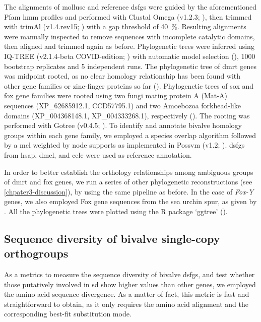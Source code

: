 The alignments of mollusc and reference \glspl{dsfg} were guided by the aforementioned Pfam \gls{hmm} profiles and performed with Clustal Omega (v1.2.3; ), then trimmed with trimAl (v1.4.rev15; ) with a gap threshold of \qty{40}{\percent}. Resulting alignments were manually inspected to remove sequences with incomplete catalytic domains, then aligned and trimmed again as before. Phylogenetic trees were inferred using IQ-TREE (v2.1.4-beta COVID-edition; ) with automatic model selection (), 1000 bootstrap replicates and 5 independent runs. The phylogenetic tree of \gls{dmrt} genes was midpoint rooted, as no clear homology relationship has been found with other gene families or zinc-finger proteins so far (). Phylogenetic trees of \gls{sox} and \gls{fox} gene families were rooted using two fungi mating protein A (Mat-A) sequences (XP\_62685912.1, CCD57795.1) and two Amoebozoa forkhead-like domains (XP\_004368148.1, XP\_004333268.1), respectively (). The rooting was performed with Gotree (v0.4.5; ). To identify and annotate bivalve homology groups within each gene family, we employed a species overlap algorithm followed by a \gls{mcl} weighted by node supports as implemented in Possvm (v1.2; ). \glspl{dsfg} from \gls{hsap}, \gls{dmel}, and \gls{cele} were used as reference annotation.

In order to better establish the orthology relationships among ambiguous groups of \gls{dmrt} and \gls{fox} genes, we run a series of other phylogenetic reconstructions (see \cref{chpater3-discussion}), by using the same pipeline as before. In the case of \textit{Fox-Y} genes, we also employed Fox gene sequences from the sea urchin \gls{spur}, as given by . All the phylogenetic trees were plotted using the R package ‘ggtree’ ().

\subsection{Sequence diversity of bivalve single-copy orthogroups}
As a metrics to measure the sequence diversity of bivalve \glspl{dsfg}, and test whether those putatively involved in \gls{sd} show higher values than other genes, we employed the amino acid sequence divergence. As a matter of fact, this metric is fast and straightforward to obtain, as it only requires the amino acid alignment and the corresponding best-fit substitution mode.

